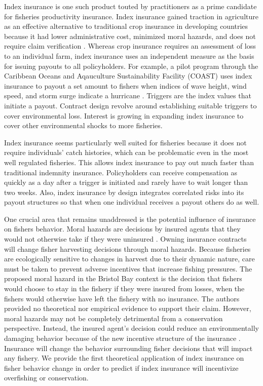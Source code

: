 \documentclass[
  super,
  preprint,
  3p]{elsarticle}
\theoremstyle{plain}
\theoremstyle{plain}
\theoremstyle{remark}
\begin{document}
Index insurance is one such product touted by practitioners as a prime
candidate for fisheries productivity insurance. Index insurance gained
traction in agriculture as an effective alternative to traditional crop
insurance in developing countries because it had lower administrative
cost, minimized moral hazards, and does not require claim verification
\citep{Carter2017, Collier2009}. Whereas crop insurance requires an
assessment of loss to an individual farm, index insurance uses an
independent measure as the basis for issuing payouts to all
policyholders. For example, a pilot program through the Caribbean Oceans
and Aqauculture Sustainability Facility (COAST) uses index insurance to
payout a set amount to fishers when indices of wave height, wind speed,
and storm surge indicate a hurricane \citep{Sainsbury2019}. Triggers are
the index values that initiate a payout. Contract design revolve around
establishing suitable triggers to cover environmental loss. Interest is
growing in expanding index insurance to cover other environmental shocks
to more fisheries.

Index insurance seems particularly well suited for fisheries because it
does not require individuals' catch histories, which can be problematic
even in the most well regulated fisheries. This allows index insurance
to pay out much faster than traditional indemnity insurance.
Policyholders can receive compensation as quickly as a day after a
trigger is initiated and rarely have to wait longer than two weeks.
Also, index insurance by design integrates correlated risks into its
payout structures so that when one individual receives a payout others
do as well.

One crucial area that remains unaddressed is the potential influence of
insurance on fishers behavior. Moral hazards are decisions by insured
agents that they would not otherwise take if they were uninsured
\citep{Wu2020}. Owning insurance contracts will change fisher harvesting
decisions through moral hazards. Because fisheries are ecologically
sensitive to changes in harvest due to their dynamic nature, care must
be taken to prevent adverse incentives that increase fishing pressures.
The proposed moral hazard in the Bristol Bay context is the decision
that fishers would choose to stay in the fishery if they were insured
from losses, when the fishers would otherwise have left the fishery with
no insurance. The authors provided no theoretical nor empirical evidence
to support their claim. However, moral hazards may not be completely
detrimental from a conservation perspective. Instead, the insured
agent's decision could reduce an environmentally damaging behavior
because of the new incentive structure of the insurance
\citep{Mishra2005, Norton2016}. Insurance will change the behavior
surrounding fisher decisions that will impact any fishery. We provide
the first theoretical application of index insurance on fisher behavior
change in order to predict if index insurance will incentivize
overfishing or conservation.
\end{document}
